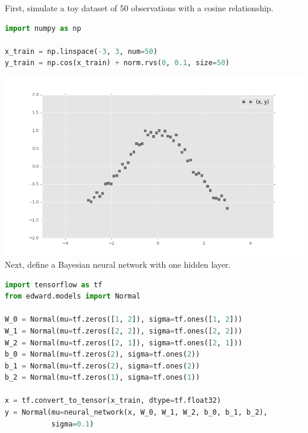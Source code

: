 First, simulate a toy dataset of 50 observations with a cosine relationship.
\begin{lstlisting}[language=Python]
import numpy as np

x_train = np.linspace(-3, 3, num=50)
y_train = np.cos(x_train) + norm.rvs(0, 0.1, size=50)
\end{lstlisting}
\includegraphics[width=700px]{images/getting-started-fig0.png}
Next, define a Bayesian neural network with one hidden layer.
\begin{lstlisting}[language=Python]
import tensorflow as tf
from edward.models import Normal

W_0 = Normal(mu=tf.zeros([1, 2]), sigma=tf.ones([1, 2]))
W_1 = Normal(mu=tf.zeros([2, 2]), sigma=tf.ones([2, 2]))
W_2 = Normal(mu=tf.zeros([2, 1]), sigma=tf.ones([2, 1]))
b_0 = Normal(mu=tf.zeros(2), sigma=tf.ones(2))
b_1 = Normal(mu=tf.zeros(2), sigma=tf.ones(2))
b_2 = Normal(mu=tf.zeros(1), sigma=tf.ones(1))

x = tf.convert_to_tensor(x_train, dtype=tf.float32)
y = Normal(mu=neural_network(x, W_0, W_1, W_2, b_0, b_1, b_2),
           sigma=0.1)
\end{lstlisting}

